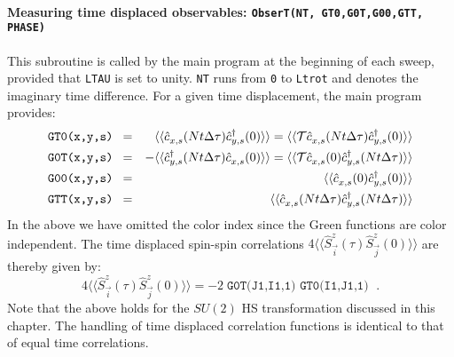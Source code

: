 \paragraph{Measuring time displaced observables: \texttt{ObserT(NT,  GT0,G0T,G00,GTT, PHASE) }}
%
This subroutine is called by the main program at the beginning of each sweep, provided that \texttt{LTAU}  is set to unity.  \texttt{NT} runs from \texttt{0}  to \texttt{Ltrot} and denotes the   imaginary time difference.   For a given time  displacement, the main program provides:
\begin{eqnarray}
\texttt{GT0(x,y,s) }  &=&   \phantom{+} \langle \langle \hat{c}^{\phantom\dagger}_{x,s} (Nt \Delta \tau)   \hat{c}^{\dagger}_{y,s} (0)   \rangle \rangle = \langle \langle {\cal T} \hat{c}^{\phantom\dagger}_{x,s} (Nt \Delta \tau)   \hat{c}^{\dagger}_{y,s} (0)   \rangle \rangle  \nonumber \\
\texttt{G0T(x,y,s) }   &=&  -   \langle \langle   \hat{c}^{\dagger}_{y,s} (Nt \Delta \tau)    \hat{c}^{\phantom\dagger}_{x,s} (0)    \rangle \rangle =
    \langle \langle {\cal T} \hat{c}^{\phantom\dagger}_{x,s} (0)    \hat{c}^{\dagger}_{y,s} (Nt \Delta \tau)   \rangle \rangle  \nonumber  \\
  \texttt{G00(x,y,s) }  &=&    \phantom{+} \langle \langle \hat{c}^{\phantom\dagger}_{x,s} (0)   \hat{c}^{\dagger}_{y,s} (0)   \rangle \rangle    \nonumber \\
    \texttt{GTT(x,y,s) }  &=&   \phantom{+} \langle \langle \hat{c}^{\phantom\dagger}_{x,s} (Nt \Delta \tau)   \hat{c}^{\dagger}_{y,s} (Nt \Delta \tau)   \rangle \rangle    
\end{eqnarray}
In the above we have omitted the color index since  the  Green functions are color independent.  The time displaced  spin-spin correlations 
$ 4 \langle \langle \hat{S}^{z}_{\vec{i}} (\tau)  \hat{S}^{z}_{\vec{j}} (0)\rangle \rangle   $ 
are thereby given by: 
\begin{equation}
	4 \langle \langle \hat{S}^{z}_{\vec{i}} (\tau)  \hat{S}^{z}_{\vec{j}} (0)\rangle \rangle   = - 2 \; \texttt{G0T(J1,I1,1) } \texttt{GT0(I1,J1,1) } \;.
\end{equation}
Note that the above holds for the $SU(2)$ HS transformation discussed in this chapter. 
The handling of time displaced correlation functions is identical to that of equal time correlations. 

